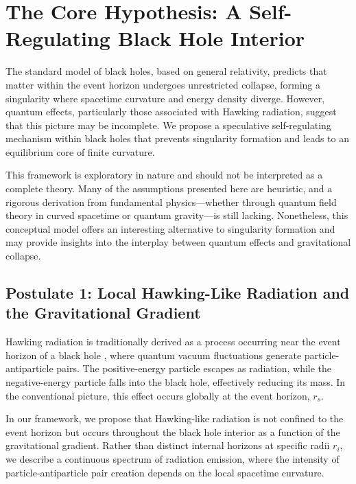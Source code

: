 \section{The Core Hypothesis: A Self-Regulating Black Hole Interior}
\label{sec:core_hypothesis}

The standard model of black holes, based on general relativity, predicts that matter within the event horizon undergoes unrestricted collapse, forming a singularity where spacetime curvature and energy density diverge. However, quantum effects, particularly those associated with Hawking radiation, suggest that this picture may be incomplete. We propose a speculative self-regulating mechanism within black holes that prevents singularity formation and leads to an equilibrium core of finite curvature.

This framework is exploratory in nature and should not be interpreted as a complete theory. Many of the assumptions presented here are heuristic, and a rigorous derivation from fundamental physics—whether through quantum field theory in curved spacetime or quantum gravity—is still lacking. Nonetheless, this conceptual model offers an interesting alternative to singularity formation and may provide insights into the interplay between quantum effects and gravitational collapse.

\subsection{Postulate 1: Local Hawking-Like Radiation and the Gravitational Gradient}

Hawking radiation is traditionally derived as a process occurring near the event horizon of a black hole \cite{hawking1975particle}, where quantum vacuum fluctuations generate particle-antiparticle pairs. The positive-energy particle escapes as radiation, while the negative-energy particle falls into the black hole, effectively reducing its mass. In the conventional picture, this effect occurs globally at the event horizon, \( r_s \).

In our framework, we propose that Hawking-like radiation is not confined to the event horizon but occurs throughout the black hole interior as a function of the gravitational gradient. Rather than distinct internal horizons at specific radii \( r_i \), we describe a continuous spectrum of radiation emission, where the intensity of particle-antiparticle pair creation depends on the local spacetime curvature.

